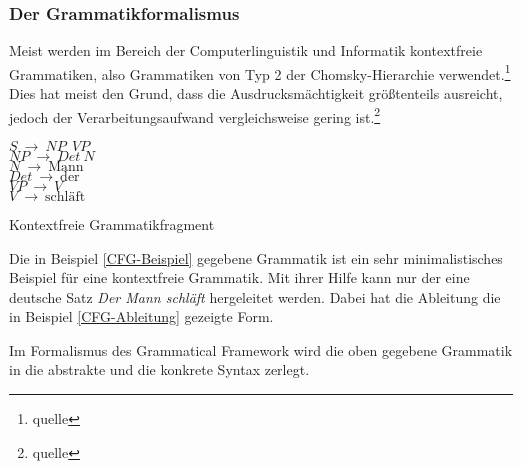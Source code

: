 \documentclass[draft,11pt]{scrartcl}
\begin{document}
\subsubsection{Der Grammatikformalismus}
Meist werden im Bereich der Computerlinguistik und Informatik kontextfreie Grammatiken, also Grammatiken von Typ 2 der Chomsky-Hierarchie verwendet.\footnote{quelle} Dies hat meist den Grund, dass die Ausdrucksmächtigkeit größtenteils ausreicht, jedoch der Verarbeitungsaufwand vergleichsweise gering ist.\footnote{quelle}
\begin{program}[h]
\begin{flushleft}
$S\ \longrightarrow\ NP\ \ VP$ \\
$NP\ \longrightarrow\ Det\ N$ \\
$N\ \longrightarrow\ \text{Mann}$ \\
$Det\ \longrightarrow\ \text{der}$ \\
$VP\ \longrightarrow\ V$ \\
$V\ \longrightarrow\ \text{schläft} $ \\
\end{flushleft}
\caption{Kontextfreie Grammatikfragment}
\label{CFG-Beispiel}
\end{program}
Die in Beispiel \ref{CFG-Beispiel} gegebene Grammatik ist ein sehr minimalistisches Beispiel für eine kontextfreie Grammatik. Mit ihrer Hilfe kann nur der eine deutsche Satz \textit{Der Mann schläft} hergeleitet werden. Dabei hat die Ableitung die in Beispiel \ref{CFG-Ableitung} gezeigte Form.
\begin{figure}
\begin{floatrow}[2]
\end{floatrow}
\end{figure}
Im Formalismus des Grammatical Framework wird die oben gegebene Grammatik in die abstrakte und die konkrete Syntax zerlegt.
\end{document}
